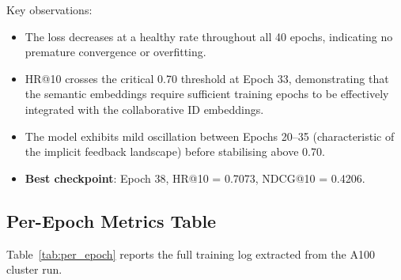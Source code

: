 \documentclass[11pt,a4paper]{article}
\begin{document}
Key observations:
\begin{itemize}[leftmargin=1.5em]
  \item The loss decreases at a healthy rate throughout all 40 epochs, indicating no premature convergence or overfitting.
  \item HR@10 crosses the critical 0.70 threshold at Epoch 33, demonstrating that the semantic embeddings require sufficient training epochs to be effectively integrated with the collaborative ID embeddings.
  \item The model exhibits mild oscillation between Epochs 20–35 (characteristic of the implicit feedback landscape) before stabilising above 0.70.
  \item \textbf{Best checkpoint}: Epoch 38, HR@10 = 0.7073, NDCG@10 = 0.4206.
\end{itemize}

\subsection{Per-Epoch Metrics Table}

Table~\ref{tab:per_epoch} reports the full training log extracted from the A100 cluster run.
\end{document}
